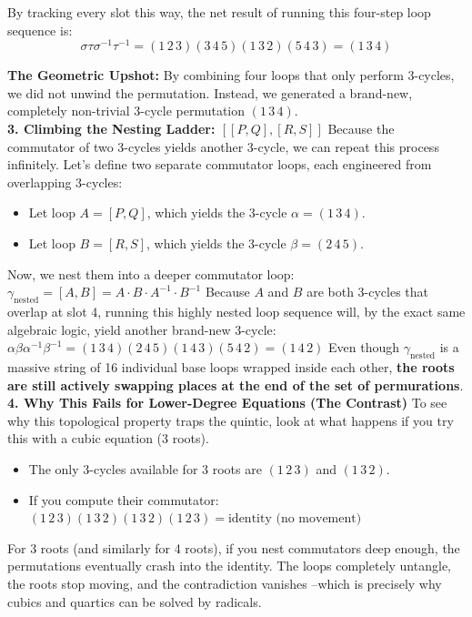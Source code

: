 By tracking every slot this way, the net result of running this four-step loop sequence is:
\[\sigma \tau \sigma ^{-1}\tau ^{-1}=(1\,2\,3)(3\,4\,5)(1\,3\,2)(5\,4\,3)=(1\,3\,4)\]

{\bf The Geometric Upshot:}
By combining four loops that only perform 3-cycles, we did not unwind the permutation. Instead, we generated a brand-new, completely non-trivial 3-cycle permutation \((1\,3\,4)\).\\

{\bf 3. Climbing the Nesting Ladder: \([[P,Q], [R,S]]\)}
Because the commutator of two 3-cycles yields another 3-cycle, we can repeat this process infinitely.
Let's define two separate commutator loops, each engineered from overlapping 3-cycles:
\begin{itemize}
\item[]Let loop \(A = [P, Q]\), which yields the 3-cycle \(\alpha = (1\,3\,4)\).
\item[] Let loop \(B = [R, S]\), which yields the 3-cycle \(\beta = (2\,4\,5)\).
\end{itemize}
Now, we nest them into a deeper commutator loop:
\(\gamma _{\text{nested}}=[A,B]=A\cdot B\cdot A^{-1}\cdot B^{-1}\)
Because \(A\) and \(B\) are both 3-cycles that overlap at slot 4, running this highly nested loop sequence will, by the exact same algebraic logic, yield another brand-new 3-cycle:
\(\alpha \beta \alpha ^{-1}\beta ^{-1}=(1\,3\,4)(2\,4\,5)(1\,4\,3)(5\,4\,2)=(1\,4\,2)\)
Even though \(\gamma _{\text{nested}}\) is a massive string of 16 individual base loops wrapped inside each other, {\bf the roots are still actively swapping places at the end of the set of permurations}.\\

{\bf 4. Why This Fails for Lower-Degree Equations (The Contrast)}
To see why this topological property traps the quintic, look at what happens if you try this with a cubic equation (3 roots).
\begin{itemize}
\item[]The only 3-cycles available for 3 roots are \((1\,2\,3)\) and \((1\,3\,2)\).
\item[]If you compute their commutator:\((1\,2\,3)(1\,3\,2)(1\,3\,2)(1\,2\,3)=\text{identity\ (no\ movement)}\)
\end{itemize}
For 3 roots (and similarly for 4 roots), if you nest commutators deep enough, the permutations eventually crash into the identity. 
The loops completely untangle, the roots stop moving, and the contradiction vanishes --which is precisely why cubics and quartics can be solved by radicals.\\

